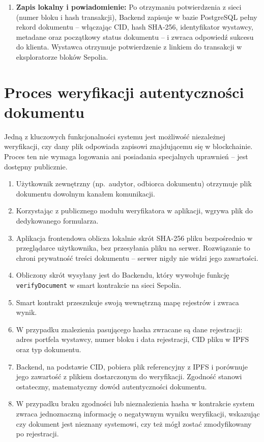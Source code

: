 \documentclass[12pt,a4paper,twoside]{report}
\begin{document}
\begin{enumerate}
    \item \textbf{Zapis lokalny i powiadomienie:} Po otrzymaniu potwierdzenia z sieci
          (numer bloku i hash transakcji), Backend zapisuje w bazie PostgreSQL pełny rekord
          dokumentu -- włączając CID, hash SHA-256, identyfikator wystawcy, metadane oraz
          początkowy status dokumentu -- i zwraca odpowiedź sukcesu do klienta. Wystawca
          otrzymuje potwierdzenie z linkiem do transakcji w eksploratorze bloków Sepolia.
\end{enumerate}

\newpage
\section{Proces weryfikacji autentyczności dokumentu}

Jedną z kluczowych funkcjonalności systemu jest możliwość niezależnej weryfikacji, czy
dany plik odpowiada zapisowi znajdującemu się w blockchainie. Proces ten nie wymaga
logowania ani posiadania specjalnych uprawnień -- jest dostępny publicznie.

\begin{enumerate}
    \item Użytkownik zewnętrzny (np.~audytor, odbiorca dokumentu) otrzymuje plik dokumentu
          dowolnym kanałem komunikacji.
    \item Korzystając z publicznego modułu weryfikatora w aplikacji, wgrywa plik do
          dedykowanego formularza.
    \item Aplikacja frontendowa oblicza lokalnie skrót SHA-256 pliku bezpośrednio
          w przeglądarce użytkownika, bez przesyłania pliku na serwer. Rozwiązanie to
          chroni prywatność treści dokumentu -- serwer nigdy nie widzi jego zawartości.
    \item Obliczony skrót wysyłany jest do Backendu, który wywołuje funkcję
          \texttt{verifyDocument} w smart kontrakcie na sieci Sepolia.
    \item Smart kontrakt przeszukuje swoją wewnętrzną mapę rejestrów i zwraca wynik.
    \item W przypadku znalezienia pasującego hasha zwracane są dane rejestracji: adres
          portfela wystawcy, numer bloku i data rejestracji, CID pliku w IPFS oraz
          typ dokumentu.
    \item Backend, na podstawie CID, pobiera plik referencyjny z IPFS i porównuje jego
          zawartość z plikiem dostarczonym do weryfikacji. Zgodność stanowi ostateczny,
          matematyczny dowód autentyczności dokumentu.
    \item W przypadku braku zgodności lub nieznalezienia hasha w kontrakcie system zwraca
          jednoznaczną informację o negatywnym wyniku weryfikacji, wskazując czy dokument
          jest nieznany systemowi, czy też mógł zostać zmodyfikowany po rejestracji.
\end{enumerate}
\end{document}
